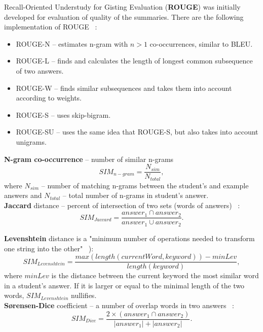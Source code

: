 Recall-Oriented Understudy for Gisting Evaluation (\textbf{ROUGE}) was initially developed for evaluation of quality of the summaries. There are the following implementation of ROUGE  ~\cite{Noorbehbahani}:
\begin{itemize}
\item ROUGE-N -- estimates n-gram with $n>1$ co-occurrences, similar to BLEU.
\item ROUGE-L -- finds and calculates the length of longest common subsequence of two answers.
\item ROUGE-W -- finds similar subsequences and takes them into account according to weights.
\item ROUGE-S -- uses skip-bigram.
\item ROUGE-SU -- uses the same idea that ROUGE-S, but also takes into account unigrams.
\end{itemize}

\textbf{N-gram co-occurrence} --  number of similar n-grams ~\cite{Noorbehbahani}
\begin{equation} \label{eq:n-gram}
SIM_{n-gram} = \frac{N_{sim}}{N_{total}},
\end{equation}
where $N_{sim}$ -- number of matching n-grams between the student's and example answers and $N_{total}$ -- total number of n-grams in student's answer.\\

\textbf{Jaccard} distance -- percent of intersection of two sets (words of answers) ~\cite{Li}:
\begin{equation} \label{eq:Jaccard}
SIM_{Jaccard} = \frac{answer_1 \cap answer_2}{answer_1 \cup answer_2}.
\end{equation}

\textbf{Levenshtein} distance is a "minimum number of operations needed to transform one string into the other" ~\cite{Gomaa}):
\begin{equation} \label{eq:Levenshtein}
SIM_{Levenshtein} = \frac{max(length(currentWord,keyword)) - minLev}{length(keyword)},
\end{equation}
where $minLev$ is the distance between the current keyword the most similar word in a student's answer. If it is larger or equal to the minimal length of the two words, $SIM_{Levenshtein}$ nullifies. \\

\textbf{S{\o}rensen-Dice} coefficient -- a number of overlap words in two answers ~\cite{Gomaa}:
\begin{equation} \label{eq:Dice}
SIM_{Dice} = \frac{2 \times (answer_1 \cap answer_2)}{|answer_1| + |answer_2|}.
\end{equation}

